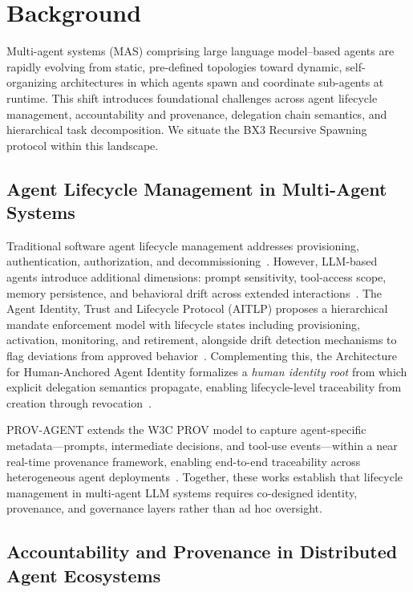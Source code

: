 \section{Background}
\label{sec:background}

Multi-agent systems (MAS) comprising large language model--based agents are rapidly evolving from static, pre-defined topologies toward dynamic, self-organizing architectures in which agents spawn and coordinate sub-agents at runtime. This shift introduces foundational challenges across agent lifecycle management, accountability and provenance, delegation chain semantics, and hierarchical task decomposition. We situate the BX3 Recursive Spawning protocol within this landscape.

\subsection{Agent Lifecycle Management in Multi-Agent Systems}
\label{sec:lifecycle}

Traditional software agent lifecycle management addresses provisioning, authentication, authorization, and decommissioning~\cite{aitlp}. However, LLM-based agents introduce additional dimensions: prompt sensitivity, tool-access scope, memory persistence, and behavioral drift across extended interactions~\cite{senior2025identity}. The Agent Identity, Trust and Lifecycle Protocol (AITLP) proposes a hierarchical mandate enforcement model with lifecycle states including provisioning, activation, monitoring, and retirement, alongside drift detection mechanisms to flag deviations from approved behavior~\cite{aitlp}. Complementing this, the Architecture for Human-Anchored Agent Identity formalizes a \emph{human identity root} from which explicit delegation semantics propagate, enabling lifecycle-level traceability from creation through revocation~\cite{humananchor2025}.

PROV-AGENT extends the W3C PROV model to capture agent-specific metadata---prompts, intermediate decisions, and tool-use events---within a near real-time provenance framework, enabling end-to-end traceability across heterogeneous agent deployments~\cite{provagent2025}. Together, these works establish that lifecycle management in multi-agent LLM systems requires co-designed identity, provenance, and governance layers rather than ad hoc oversight.

\subsection{Accountability and Provenance in Distributed Agent Ecosystems}
\label{sec:accountability}

